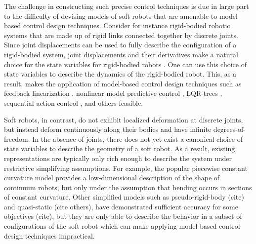 The challenge in constructing such precise control techniques is due in large part to the difficulty of devising models of soft robots that are amenable to model based control design techniques.
Consider for instance rigid-bodied robotic systems that are made up of rigid links connected together by discrete joints.
Since joint displacements can be used to fully describe the configuration of a rigid-bodied system, joint displacements and their derivatives make a natural choice for the state variables for rigid-bodied robots \cite{spong2008robot}.
One can use this choice of state variables to describe the dynamics of the rigid-bodied robot.
This, as a result, makes the application of model-based control design techniques such as feedback linearization \cite{}, nonlinear model predictive control \cite{}, LQR-trees \cite{}, sequential action control \cite{ansari2016sequential}, and others feasible.  

Soft robots, in contrast, do not exhibit localized deformation at discrete joints, but instead deform continuously along their bodies and have infinite degrees-of-freedom.
In the absence of joints, there does not yet exist a canonical choice of state variables to describe the geometry of a soft robot.
As a result, existing representations are typically only rich enough to describe the system under restrictive simplifying assumptions.
For example, the popular piecewise constant curvature model \cite{webster2010design} provides a low-dimensional description of the shape of continuum robots, but only under the assumption that bending occurs in sections of constant curvature.
Other simplified models such as pseudo-rigid-body (cite) and quasi-static \cite{bruder2018iros} (cite others), have demonstrated sufficient accuracy for some objectives (cite),  
but they are only able to describe the behavior in a subset of configurations of the soft robot which can make applying model-based control design techniques impractical. 

